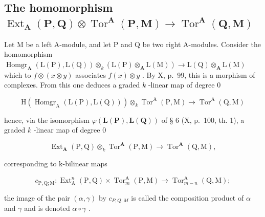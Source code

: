 \subsection{\texorpdfstring{The homomorphism \(\operatorname{Ext}_{\mathbf{A}}(\mathbf{P}, \mathbf{Q}) \otimes \operatorname{Tor}^{\mathbf{A}}(\mathbf{P}, \mathbf{M}) \to \operatorname{Tor}^{\mathbf{A}}(\mathbf{Q}, \mathbf{M})\)}{The homomorphism \textbackslash operatorname\{Ext\}\_\{\textbackslash mathbf\{A\}\}(\textbackslash mathbf\{P\}, \textbackslash mathbf\{Q\}) \textbackslash otimes \textbackslash operatorname\{Tor\}\^{}\{\textbackslash mathbf\{A\}\}(\textbackslash mathbf\{P\}, \textbackslash mathbf\{M\}) \textbackslash to \textbackslash operatorname\{Tor\}\^{}\{\textbackslash mathbf\{A\}\}(\textbackslash mathbf\{Q\}, \textbackslash mathbf\{M\})}}

Let M be a left A-module, and let P and Q be two right A-modules. Consider the homomorphism \(\operatorname{Homgr}_{\mathbf{A}}(\mathrm{L}(\mathrm{P}), \mathrm{L}(\mathrm{Q})) \otimes_{k} (\mathrm{L}(\mathrm{P}) \otimes_{\mathbf{A}} \mathrm{L}(\mathrm{M})) \to \mathrm{L}(\mathrm{Q}) \otimes_{\mathbf{A}} \mathrm{L}(\mathrm{M})\) which to \(f \otimes (x \otimes y)\) associates \(f(x) \otimes y\) . By X, p.~99, this is a morphism of complexes. From this one deduces a graded \(k\) -linear map of degree 0

\[
\mathrm{H} (\operatorname{Homgr} _ {\mathrm{A}} (\mathrm{L} (\mathrm{P}), \mathrm{L} (\mathrm{Q}))) \otimes_ {k} \operatorname{Tor} ^ {\mathrm{A}} (\mathrm{P}, \mathrm{M}) \rightarrow \operatorname{Tor} ^ {\mathrm{A}} (\mathrm{Q}, \mathrm{M})
\]

hence, via the isomorphism \(\varphi(\mathbf{L}(\mathbf{P}),\mathbf{L}(\mathbf{Q}))\) of § 6 (X, p.~100, th. 1), a graded \(k\) -linear map of degree 0

\[
\operatorname{Ext} _ {\mathbf {A}} (\mathrm{P}, \mathrm{Q}) \otimes_ {k} \operatorname{Tor} ^ {\mathbf {A}} (\mathrm{P}, \mathrm{M}) \rightarrow \operatorname{Tor} ^ {\mathbf {A}} (\mathrm{Q}, \mathrm{M}),\tag{10}
\]

corresponding to k-bilinear maps

\[
c _ {\mathrm{P}, \mathrm{Q}; \mathrm{M}}: \operatorname{Ext} _ {\mathrm{A}} ^ {n} (\mathrm{P}, \mathrm{Q}) \times \operatorname{Tor} _ {m} ^ {\mathrm{A}} (\mathrm{P}, \mathrm{M}) \rightarrow \operatorname{Tor} _ {m - n} ^ {\mathrm{A}} (\mathrm{Q}, \mathrm{M});\tag{11}
\]

the image of the pair \((\alpha, \gamma)\) by \(c_{P,Q;M}\) is called the composition product of \(\alpha\) and \(\gamma\) and is denoted \(\alpha \circ \gamma\) .

